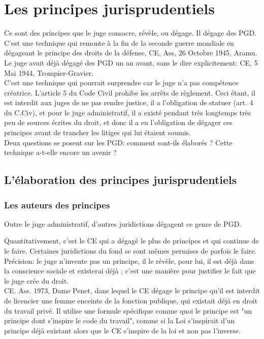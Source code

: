 \documentclass[10pt, a4paper, openany]{book}
\begin{document}
\chapter{Les principes jurisprudentiels}

Ce sont des principes que le juge consacre, révèle, ou dégage. Il dégage des PGD. C'est une technique qui remonte à la fin de la seconde guerre mondiale en dégageant le principe des droits de la défense, CE, Ass, 26 Octobre 1945, Aramu. Le juge avait déjà dégagé des PGD un an avant, sans le dire explicitement: CE, 5 Mai 1944, Trompier-Gravier. \\
C'est une technique qui pourrait surprendre car le juge n'a pas compétence créatrice. L'article 5 du Code Civil prohibe les arrêts de règlement. Ceci étant, il est interdit aux juges de ne pas rendre justice, il a l'obligation de statuer (art. 4 du C.Civ), et pour le juge administratif, il a existé pendant très longtemps très peu de sources écrites du droit, et donc il a eu l'obligation de dégager ces principes avant de trancher les litiges qui lui étaient soumis. \\
Deux questions se posent sur les PGD: comment sont-ils élaborés ? Cette technique a-t-elle encore un avenir ? 

\section{L'élaboration des principes jurisprudentiels}

\subsection{Les auteurs des principes}

Outre le juge administratif, d'autres juridictions dégagent ce genre de PGD. 


Quantitativement, c'est le CE qui a dégagé le plus de principes et qui continue de le faire. Certaines juridictions du fond se sont mêmes permises de parfois le faire. Précision: le juge n'invente pas un principe, il le révèle, pour lui, il est déjà dans la conscience sociale et existerai déjà ; c'est une manière pour justifier le fait que le juge crée du droit.  \\
CE. Ass. 1973, Dame Penet, dans lequel le CE dégage le principe qu'il est interdit de licencier une femme enceinte de la fonction publique, qui existait déjà en droit du travail privé. Il utilise une formule spécifique comme quoi le principe est "un principe dont s'inspire le code du travail", comme si la Loi s'inspirait d'un principe déjà existant alors que le CE s'inspire de la loi et non pas l'inverse.
\end{document}
